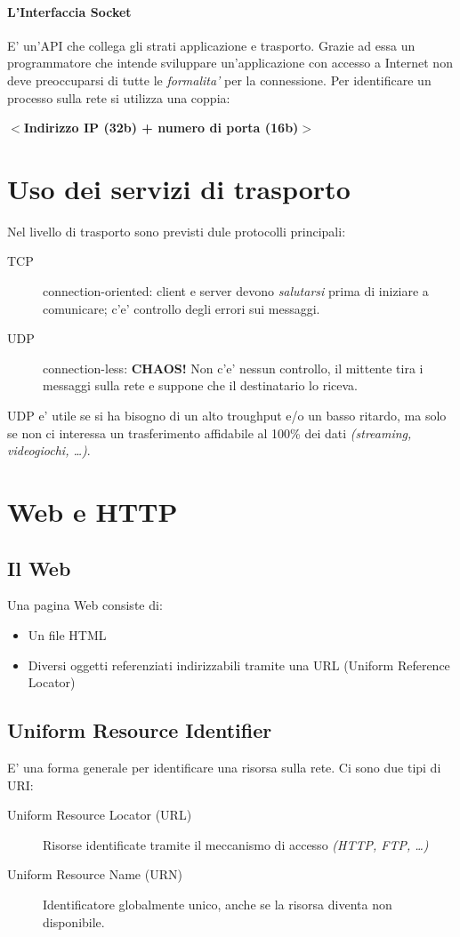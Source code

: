 \paragraph{L'Interfaccia Socket} E' un'API che collega gli strati applicazione e trasporto.
Grazie ad essa un programmatore che intende sviluppare un'applicazione con accesso a Internet non deve preoccuparsi di tutte le \textit{formalita'} per la connessione.
Per identificare un processo sulla rete si utilizza una coppia:
\begin{center}
    \textbf{\color{blue} $<$Indirizzo IP (32b) + numero di porta (16b)$>$}
\end{center}
\section{Uso dei servizi di trasporto}
Nel livello di trasporto sono previsti dule protocolli principali:
\begin{description}
    \item[TCP] connection-oriented: client e server devono \textit{salutarsi} prima di iniziare a comunicare; c'e' controllo degli errori sui messaggi.
    \item[UDP] connection-less: \textbf{\huge\color{red}CHAOS!} Non c'e' nessun controllo, il mittente tira i messaggi sulla rete e suppone che il destinatario lo riceva.
\end{description}
UDP e' utile se si ha bisogno di un alto troughput e/o un basso ritardo, ma solo se non ci interessa un trasferimento affidabile al 100\% dei dati \textit{(streaming, videogiochi, \dots)}.
\newpage
\section{Web e HTTP}
\subsection{Il Web}
Una pagina Web consiste di:
\begin{itemize}
    \item Un file HTML
    \item Diversi oggetti referenziati indirizzabili tramite una URL (Uniform Reference Locator)
\end{itemize}
\subsection{Uniform Resource Identifier}
E' una forma generale per identificare una risorsa sulla rete.
Ci sono due tipi di URI:
\begin{description}
    \item[Uniform Resource Locator (URL)] Risorse identificate tramite il meccanismo di accesso \textit{(HTTP, FTP, \dots)}
    \item[Uniform Resource Name (URN)] Identificatore globalmente unico, anche se la risorsa diventa non disponibile.
\end{description}
